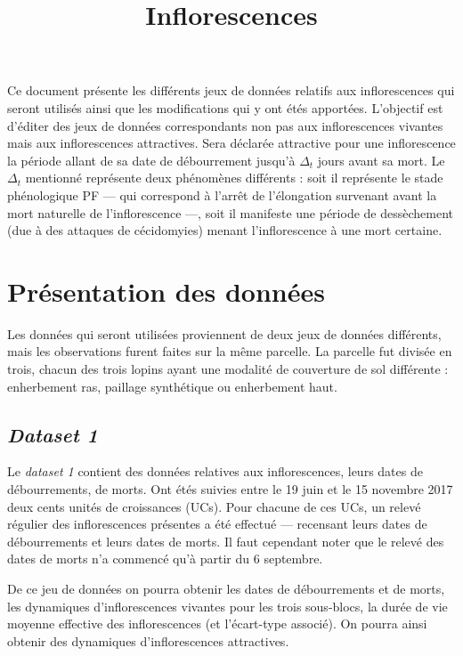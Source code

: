 \documentclass[a4paper, 11pt]{article}
\title{Inflorescences}
\author{}
\date{}
\begin{document}
\maketitle

Ce document présente les différents jeux de données relatifs aux inflorescences qui seront utilisés ainsi que les modifications qui y ont étés apportées.
L'objectif est d'éditer des jeux de données correspondants non pas aux inflorescences vivantes mais aux inflorescences attractives. Sera déclarée attractive pour une inflorescence la période allant de sa date de débourrement jusqu'à $\Delta_t$ jours avant sa mort. Le $\Delta_t$ mentionné représente deux phénomènes différents : soit il représente le stade phénologique PF --- qui correspond à l'arrêt de l'élongation survenant avant la mort naturelle de l'inflorescence ---, soit il manifeste une période de dessèchement (due à des attaques de cécidomyies) menant l'inflorescence à une mort certaine.

\section{Présentation des données}

Les données qui seront utilisées proviennent de deux jeux de données différents, mais les observations furent faites sur la même parcelle. La parcelle fut divisée en trois, chacun des trois lopins ayant une modalité de couverture de sol différente : enherbement ras, paillage synthétique ou enherbement haut.

\subsection{\textit{Dataset 1}}

Le \textit{dataset 1} contient des données relatives aux inflorescences, leurs dates de débourrements, de morts. Ont étés suivies entre le 19 juin et le 15 novembre 2017 deux cents unités de croissances (UCs). Pour chacune de ces UCs, un relevé régulier des inflorescences présentes a été effectué --- recensant leurs dates de débourrements et leurs dates de morts.
Il faut cependant noter que le relevé des dates de morts n'a commencé qu'à partir du 6 septembre.

De ce jeu de données on pourra obtenir les dates de débourrements et de morts, les dynamiques d'inflorescences vivantes pour les trois sous-blocs, la durée de vie moyenne effective des inflorescences (et l'écart-type associé). On pourra ainsi obtenir des dynamiques d'inflorescences attractives.
\end{document}
